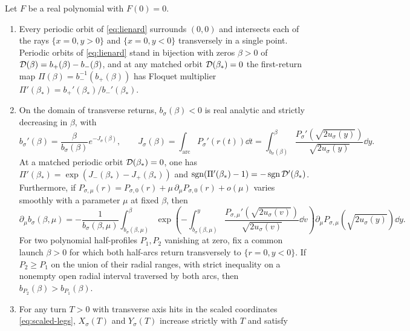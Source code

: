 \begin{lemma}\label{lem:variational}
Let $F$ be a real polynomial with $F(0)=0$.
\begin{enumerate}
  \item[\textup{(i)}] Every periodic orbit of \eqref{eq:lienard} surrounds $(0,0)$ and intersects each
  of the rays $\{x=0,y>0\}$ and $\{x=0,y<0\}$ transversely in a single point. Periodic orbits of
  \eqref{eq:lienard} stand in bijection with zeros $\beta>0$ of $\mathcal{D}(\beta)=b_+(\beta)-b_-(\beta)$,
  and at any matched orbit $\mathcal{D}(\beta_*)=0$ the first-return map $\Pi(\beta)=b_-^{-1}(b_+(\beta))$
  has Floquet multiplier $\Pi'(\beta_*)=b_+'(\beta_*)/b_-'(\beta_*)$.
  \item[\textup{(ii)}] On the domain of transverse returns, $b_\sigma(\beta)<0$ is real analytic and strictly decreasing in $\beta$, with
  \begin{equation}\label{eq:b-deriv}
    b_\sigma'(\beta) = \frac{\beta}{b_\sigma(\beta)} e^{-J_\sigma(\beta)}, \qquad J_\sigma(\beta) =
    \int_{\mathrm{arc}} P_\sigma'(r(t))\dd t = \int_{b_\sigma(\beta)}^{\beta}
    \frac{P_\sigma'(\sqrt{2u_\sigma(y)})}{\sqrt{2u_\sigma(y)}}\dd y.
  \end{equation}
  At a matched periodic orbit $\mathcal{D}(\beta_*)=0$, one has
  $\Pi'(\beta_*)=\exp(J_-(\beta_*)-J_+(\beta_*))$ and $\operatorname{sgn}(\Pi'(\beta_*)-1)=-\operatorname{sgn}\mathcal{D}'(\beta_*)$.
  Furthermore, if $P_{\sigma,\mu}(r)=P_{\sigma,0}(r)+\mu\,\partial_\mu P_{\sigma,0}(r)+o(\mu)$ varies
  smoothly with a parameter $\mu$ at fixed $\beta$, then
  \begin{equation}\label{eq:b-param}
    \partial_\mu b_\sigma(\beta,\mu) = -\frac{1}{b_\sigma(\beta,\mu)}
    \int_{b_\sigma(\beta,\mu)}^{\beta} \exp\!\left(-\int_{b_\sigma(\beta,\mu)}^{y}
    \frac{P_{\sigma,\mu}'(\sqrt{2u_\sigma(v)})}{\sqrt{2u_\sigma(v)}}\dd v\right) \partial_\mu
    P_{\sigma,\mu}(\sqrt{2u_\sigma(y)})\dd y.
  \end{equation}
  For two polynomial half-profiles $P_1,P_2$ vanishing at zero, fix a common
  launch $\beta>0$ for which both half-arcs return transversely to
  $\{r=0,y<0\}$. If $P_2\ge P_1$ on the union of their radial ranges,
  with strict inequality on a nonempty open radial interval traversed
  by both arcs, then $b_{P_2}(\beta)>b_{P_1}(\beta)$.
  \item[\textup{(iii)}] For any turn $T>0$ with transverse axis hits in the scaled coordinates
  \eqref{eq:scaled-legs}, $X_\sigma(T)$ and $Y_\sigma(T)$ increase strictly with $T$ and satisfy

\end{enumerate}
\end{lemma}
